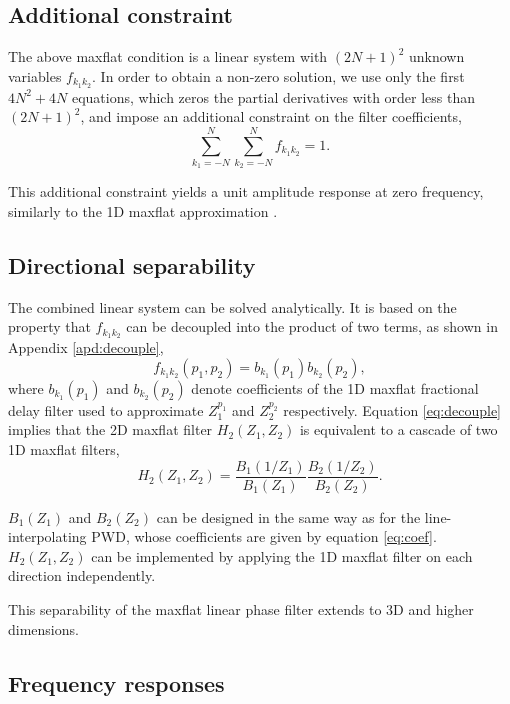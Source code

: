 \subsection{Additional constraint}

The above maxflat condition is a linear system
with $(2N+1)^2$ unknown variables $f_{k_1k_2}$.
In order to obtain a non-zero solution, 
we use only the first $4N^2+4N$ equations,
which zeros the partial derivatives 
with order less than $(2N+1)^2$,
and impose an additional constraint on the filter coefficients,
\begin{equation}\label{eq:pcmf}
\sum_{k_1=-N}^N\sum_{k_2=-N}^Nf_{k_1k_2}=1.
\end{equation}

This additional constraint yields a
unit amplitude response at zero frequency,
similarly to the 1D maxflat approximation \cite[]{chen:2012a}.


\subsection{Directional separability}

The combined linear system can be solved analytically.  It
is based on the property that $f_{k_1k_2}$ can be
decoupled into the product of two terms, 
as shown in Appendix \ref{apd:decouple},
\begin{equation}\label{eq:decouple}
f_{k_1k_2}(p_1,p_2)=b_{k_1}(p_1)b_{k_2}(p_2),
\end{equation}
where $b_{k_1}(p_1)$ and $b_{k_2}(p_2)$ denote 
coefficients of the 1D maxflat fractional delay filter used 
to approximate $Z_1^{p_1}$ and $Z_2^{p_2}$ respectively.
Equation \ref{eq:decouple} implies 
that the 2D maxflat filter $H_2(Z_1,Z_2)$ is equivalent 
to a cascade of two 1D maxflat filters,
\begin{equation}
H_2(Z_1,Z_2)=
\frac{B_1(1/Z_1)}{B_1(Z_1)}
\frac{B_2(1/Z_2)}{B_2(Z_2)}.
\end{equation}

$B_1(Z_1)$ and $B_2(Z_2)$ can be designed
in the same way as for the line-interpolating PWD,
whose coefficients are given by
equation \ref{eq:coef}.
$H_2(Z_1,Z_2)$ can be implemented by applying the 1D maxflat filter 
on each direction independently.

This separability of the maxflat linear phase filter extends to
3D and higher dimensions.

\subsection{Frequency responses}

